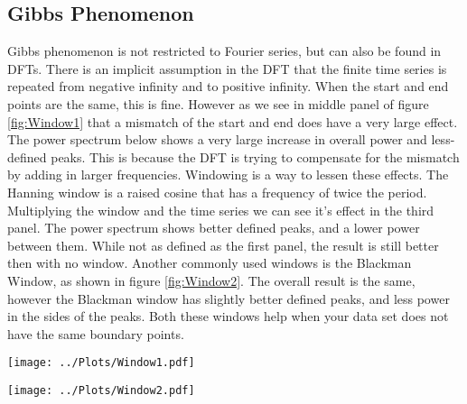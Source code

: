 \documentclass[twocolumn]{myarticle}
\begin{document}
\subsection{Gibbs Phenomenon}
Gibbs phenomenon is not restricted to Fourier series, but can also be found in DFTs. There is an implicit assumption in the DFT that the finite time series is repeated from negative infinity and to positive infinity. When the start and end points are the same, this is fine. However as we see in middle panel of figure \ref{fig:Window1} that a mismatch of the start and end does have a very large effect. The power spectrum below shows a very large increase in overall power and less-defined peaks. This is because the DFT is trying to compensate for the mismatch by adding in larger frequencies. Windowing is a way to lessen these effects. The Hanning window is a raised cosine that has a frequency of twice the period. Multiplying the window and the time series we can see it's effect in the third panel. The power spectrum shows better defined peaks, and a lower power between them. While not as defined as the first panel, the result is still better then with no window. Another commonly used windows is the Blackman Window, as shown in figure \ref{fig:Window2}. The overall result is the same, however the Blackman window has slightly better defined peaks, and less power in the sides of the peaks. Both these windows help when your data set does not have the same boundary points.

\begin{figure*}[htpb]
    \centering
    \texttt{[image: ../Plots/Window1.pdf]}
    \caption{%
        Looking at the Hanning window. The top resents the time series of a plain sine wave, a sine wave that is not periodic in the interval, and the effect of the Hanning window on the non-periodic wave. The bottom displays the corresponding power spectrums.
    }
    \label{fig:Window1}
\end{figure*}

\begin{figure*}[htpb]
    \centering
    \texttt{[image: ../Plots/Window2.pdf]}
    \caption{%
        Looking at the Blackman window. The top resents the time series of a plain sine wave, a sine wave that is not periodic in the interval, and the effect of the Hanning window on the non-periodic wave. The bottom displays the corresponding power spectrums.
    }
    \label{fig:Window2}
\end{figure*}
\end{document}
